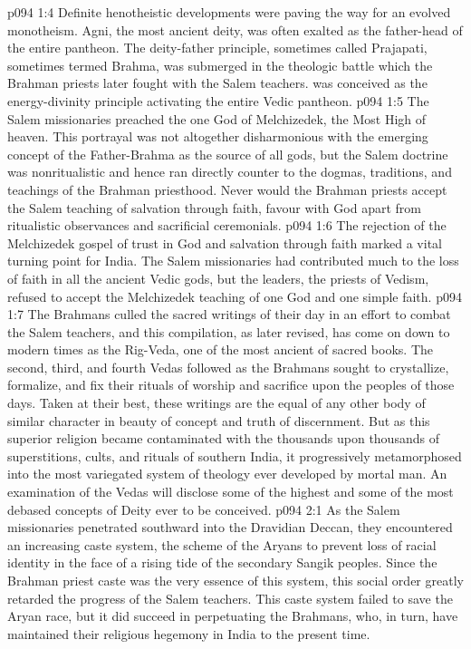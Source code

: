\vs p094 1:4 Definite henotheistic developments were paving the way for an evolved monotheism. Agni, the most ancient deity, was often exalted as the father\hyp{}head of the entire pantheon. The deity\hyp{}father principle, sometimes called Prajapati, sometimes termed Brahma, was submerged in the theologic battle which the Brahman priests later fought with the Salem teachers.  was conceived as the energy\hyp{}divinity principle activating the entire Vedic pantheon.
\vs p094 1:5 \pc The Salem missionaries preached the one God of Melchizedek, the Most High of heaven. This portrayal was not altogether disharmonious with the emerging concept of the Father\hyp{}Brahma as the source of all gods, but the Salem doctrine was nonritualistic and hence ran directly counter to the dogmas, traditions, and teachings of the Brahman priesthood. Never would the Brahman priests accept the Salem teaching of salvation through faith, favour with God apart from ritualistic observances and sacrificial ceremonials.
\vs p094 1:6 \pc The rejection of the Melchizedek gospel of trust in God and salvation through faith marked a vital turning point for India. The Salem missionaries had contributed much to the loss of faith in all the ancient Vedic gods, but the leaders, the priests of Vedism, refused to accept the Melchizedek teaching of one God and one simple faith.
\vs p094 1:7 The Brahmans culled the sacred writings of their day in an effort to combat the Salem teachers, and this compilation, as later revised, has come on down to modern times as the Rig\hyp{}Veda, one of the most ancient of sacred books. The second, third, and fourth Vedas followed as the Brahmans sought to crystallize, formalize, and fix their rituals of worship and sacrifice upon the peoples of those days. Taken at their best, these writings are the equal of any other body of similar character in beauty of concept and truth of discernment. But as this superior religion became contaminated with the thousands upon thousands of superstitions, cults, and rituals of southern India, it progressively metamorphosed into the most variegated system of theology ever developed by mortal man. An examination of the Vedas will disclose some of the highest and some of the most debased concepts of Deity ever to be conceived.
\vs p094 2:1 As the Salem missionaries penetrated southward into the Dravidian Deccan, they encountered an increasing caste system, the scheme of the Aryans to prevent loss of racial identity in the face of a rising tide of the secondary Sangik peoples. Since the Brahman priest caste was the very essence of this system, this social order greatly retarded the progress of the Salem teachers. This caste system failed to save the Aryan race, but it did succeed in perpetuating the Brahmans, who, in turn, have maintained their religious hegemony in India to the present time.

